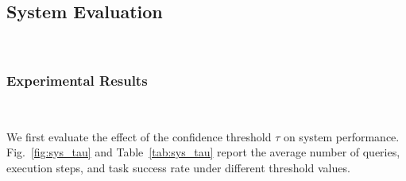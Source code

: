 \subsection{System Evaluation}~\label{exp:sys_eval}

\subsubsection{Experimental Results}~\label{exp:sys_results}


We first evaluate the effect of the confidence threshold $\tau$ on system performance. Fig.~\ref{fig:sys_tau} and Table~\ref{tab:sys_tau} report the average number of queries, execution steps, and task success rate under different threshold values.


